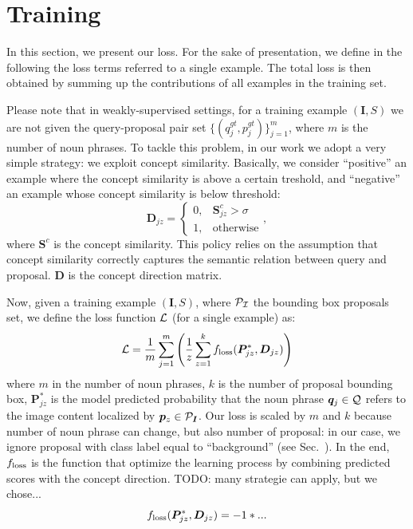 \documentclass{article}
\begin{document}
\section{Training}

In this section, we present our loss. For the sake of presentation, we
define in the following the loss terms referred to a single example.
The total loss is then obtained by summing up the contributions of all
examples in the training set.

Please note that in weakly-supervised settings, for a training example
$\left( \bm{I}, S \right)$ we are not given the query-proposal pair
set $\{ ( q^{gt}_j, p^{gt}_j ) \}^m_{j=1}$, where $m$ is the number of
noun phrases.
To tackle this problem, in our work we adopt a very simple strategy:
we exploit concept similarity. Basically, we consider ``positive'' an
example where the concept similarity is above a certain treshold, and
``negative'' an example whose concept similarity is below threshold:
\begin{equation}
  \bm{D}_{jz} =
  \begin{cases}
    0, & \bm{S}^c_{jz} > \sigma \\
    1, & \text{otherwise}
  \end{cases},
\end{equation}
where $\bm{S}^c$ is the concept similarity. This policy relies on the
assumption that concept similarity correctly captures the semantic
relation between query and proposal. $\bm{D}$ is the concept direction
matrix.

Now, given a training example $\left( \bm{I}, S \right)$, where
$\cal{P}_{\bm{I}}$ the bounding box proposals set, we define the loss
function $\mathcal{L}$ (for a single example) as:
\begin{equation}
  \mathcal{L} = \frac{1}{m} \sum^m_{j=1} \Bigg( \frac{1}{z} \sum^k_{z=1} f_{\text{loss}} ( \bm{P}^*_{jz}, \bm{D}_{jz} ) \Bigg)
\end{equation}
where $m$ in the number of noun phrases, $k$ is the number of proposal
bounding box, $\bm{P}^*_{jz}$ is the model predicted probability that
the noun phrase $\bm{q}_j \in \mathcal{Q}$ refers to the image content
localized by $\bm{p}_z \in \mathcal{P}_{\bm{I}}$. Our loss is scaled by $m$
and $k$ because number of noun phrase can change, but also number of
proposal: in our case, we ignore proposal with class label equal to
``background'' (see Sec.~). In the end, $f_{\text{loss}}$ is the
function that optimize the learning process by combining predicted
scores with the concept direction. TODO: many strategie can apply, but
we chose...
\begin{equation}
  \floss ( \bm{P}^*_{jz}, \bm{D}_{jz} ) = -1 * ... %
\end{equation}
\end{document}
